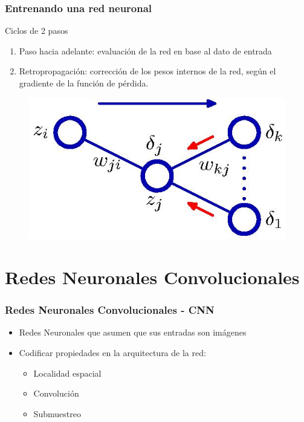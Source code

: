 \documentclass[10pt,center]{beamer}
\begin{document}
\begin{frame}
    \frametitle{Entrenando una red neuronal}
    Ciclos de 2 pasos
    \begin{enumerate}
      \item Paso hacia adelante: evaluación de la red en base al dato de entrada
      \item Retropropagación: corrección de los pesos internos de la red, según el gradiente de la función de pérdida.
    \end{enumerate}

    \begin{figure}[ht]
      \begin{center}
      \includegraphics[width=0.5\linewidth]{./img/bishop_backpropagation.jpg}
      \end{center}
    \end{figure}
\end{frame}


\section{Redes Neuronales Convolucionales}
\begin{frame}
  \frametitle{Redes Neuronales Convolucionales - CNN}
    \begin{itemize}
      \item Redes Neuronales que asumen que sus entradas son imágenes
      \item Codificar propiedades en la arquitectura de la red:
      \begin{itemize}
	\item Localidad espacial
	\item Convolución
	\item Submuestreo
      \end{itemize}
    \end{itemize}
\end{frame}
  
\end{document}
